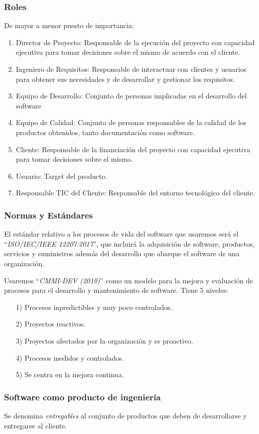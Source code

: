 \subsubsection{Roles}
\noindent De mayor a menor puesto de importancia:
\begin{enumerate}
        \item Director de Proyecto: Responsable de la ejecución del proyecto con capacidad ejecutiva
              para tomar decisiones sobre el mismo de acuerdo con el cliente.
        \item Ingeniero de Requisitos: Responsable de interactuar con
              clientes y usuarios para obtener sus necesidades y de desarrollar y
              gestionar los requisitos.
        \item Equipo de Desarrollo: Conjunto de personas implicadas en el desarrollo del software
        \item Equipo de Calidad: Conjunto de personas responsables de la calidad de los productos
              obtenidos, tanto documentación como software.
        \item Cliente: Responsable de la financiación del proyecto con capacidad ejecutiva
              para tomar decisiones sobre el mismo.
        \item Usuario: Target del producto.
        \item Responsable TIC del Cliente: Responsable del entorno tecnológico del cliente.
\end{enumerate}
\subsubsection{Normas y Estándares}
\noindent El estándar relativo a los procesos de vida del software que usaremos será el ``\textit{ISO/IEC/IEEE 12207:2017}'', que incluirá la adquisición de software, productos, servicios y suministros además del desarrollo que abarque el software de una organización.
\par \noindent Usaremos ``\textit{CMMI-DEV (2010)}'' como un modelo para la mejora y evaluación de procesos para el desarrollo y mantenimiento de software. Tiene 5 niveles:
\begin{enumerate}
        \item[1)] Procesos inpredictibles y muy poco controlados.
        \item[2)] Proyectos reactivos.
        \item[3)] Proyectos afectados por la organización y es proactivo.
        \item[4)] Procesos medidos y controlados.
        \item[5)]    Se centra en la mejora continua.
\end{enumerate}
\subsubsection{Software como producto de ingeniería}
\noindent Se denomina \textit{entregables} al conjunto de productos que deben de desarrollarse y entregarse al cliente.
